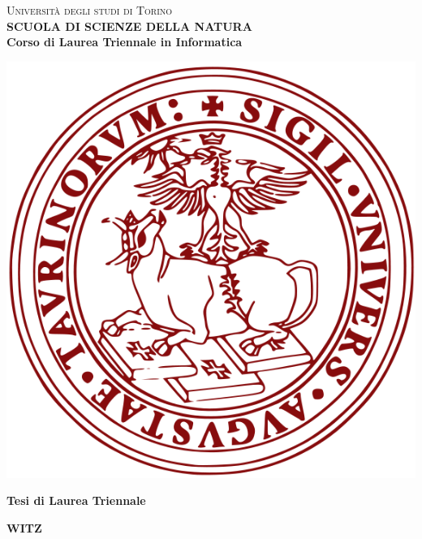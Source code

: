 \begin{titlepage}
\begin{center}
{{\Large{\textsc{Universit\`a degli studi di Torino \\}}}} \vspace{5mm} {\small{\bf SCUOLA DI SCIENZE DELLA NATURA\\ \vspace{3mm}
Corso di Laurea Triennale in Informatica}}
\vspace{5mm}
\end{center}
\begin{center}
\includegraphics[scale=.3]{head/logo.png}
\end{center}
\begin{center}
\vspace{5mm}
{\large{\bf Tesi di Laurea Triennale\\}}

\vspace{20mm}
{\LARGE{\bf WITZ}}
\vspace{5mm}


\end{center}
\end{titlepage}
